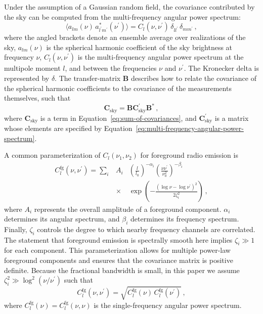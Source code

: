 \documentclass[twocolumn]{aastex62}
\renewcommand{\b}{\pmb}
\begin{document}
Under the assumption of a Gaussian random field, the covariance contributed by the sky can be
computed from the multi-frequency angular power spectrum:
\begin{equation}\label{eq:multi-frequency-angular-power-spectrum}
    \langle a_{lm}(\nu) \, a_{l^\prime m^\prime}^*(\nu^\prime)\rangle
        = C_l(\nu, \nu^\prime) \, \delta_{ll^\prime} \, \delta_{mm^\prime}\,,
\end{equation}
where the angled brackets denote an ensemble average over realizations of the sky, $a_{lm}(\nu)$ is
the spherical harmonic coefficient of the sky brightness at frequency $\nu$, $C_l(\nu, \nu^\prime)$
is the multi-frequency angular power spectrum at the multipole moment $l$, and between the
frequencies $\nu$ and $\nu^\prime$. The Kronecker delta is represented by $\delta$.  The
transfer-matrix $\b B$ describes how to relate the covariance of the spherical harmonic coefficients
to the covariance of the measurements themselves, such that
\begin{equation}\label{eq:maps-to-covariance}
    \b C_\text{sky} = \b B \b C^\prime_\text{sky} \b B^*\,,
\end{equation}
where $\b C_\text{sky}$ is a term in Equation~\ref{eq:sum-of-covariances}, and $\b
C^\prime_\text{sky}$ is a matrix whose elements are specified by
Equation~\ref{eq:multi-frequency-angular-power-spectrum}.

A common parameterization of $C_l(\nu_1, \nu_2)$ for foreground radio emission is
\citep{2005ApJ...625..575S}
\begin{eqnarray}\label{eq:cforeground}
    C_l^\text{fg}(\nu, \nu^\prime) =
    \sum_i &A_i& \left(\frac{l}{l_0}\right)^{-\alpha_i}
                 \left(\frac{\nu\nu^\prime}{\nu_0^2}\right)^{-\beta_i} \nonumber \\
           &\times&\exp\left(-\frac{(\log\nu-\log\nu^\prime)^2}{2\zeta_i^2}\right)\,,
\end{eqnarray}
where $A_i$ represents the overall amplitude of a foreground component.  $\alpha_i$ determines its
angular spectrum, and $\beta_i$ determines its frequency spectrum. Finally, $\zeta_i$ controls the
degree to which nearby frequency channels are correlated. The statement that foreground emission is
spectrally smooth here implies $\zeta_i \gg 1$ for each component. This parameterization allows for
multiple power-law foreground components and ensures that the covariance matrix is positive
definite.  Because the fractional bandwidth is small, in this paper we assume $\zeta_i^2 \gg
\log^2(\nu/\nu^\prime)$ such that
\begin{equation}
    C_l^\text{fg}(\nu, \nu^\prime) = \sqrt{C_l^\text{fg}(\nu)\,C_l^\text{fg}(\nu^\prime)}\,,
\end{equation}
where $C_l^\text{fg}(\nu) = C_l^\text{fg}(\nu, \nu)$ is the single-frequency angular power spectrum.
\end{document}
